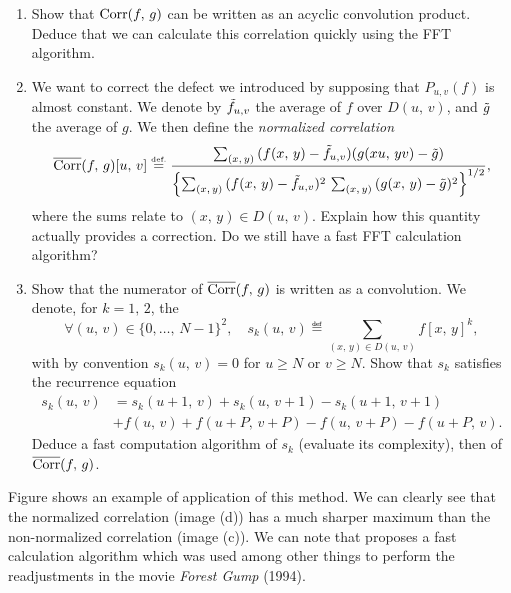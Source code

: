 \begin{exo}
\begin{enumerate}
\item {} Show that $ \operatorname{Corr} (f, \, g) $ can be written as an acyclic convolution product. Deduce that we can calculate this correlation quickly using the FFT algorithm.
\item {} \label{notation-56} We want to correct the defect we introduced by supposing that $ P_{u, v} (f) $ is almost constant. We denote by $ \tilde{f}_{u, v} $ the average of $ f $ over $ D (u, \, v) $, and $ \tilde{g} $ the average of $ g $. We then define the \textit{normalized correlation}
\begin{equation*}
\overline{\operatorname{Corr}} (f, \, g) [u, \, v] \stackrel{\mbox{\upshape\tiny def.}}{=} \frac{\sum_{(x, \, y)}{(f(x, \, y) - \tilde{f}_{u, v}) (g (xu, \, yv) - \tilde{g})}}{\left\{\sum_{(x, \, y)}{(f(x, \, y) - \tilde{f}_{u, v})^2} \, \sum_{(x, \, y)}{(g (x, \, y) - \tilde{g})^2} \right\}^{1/2}},
\end{equation*}
where the sums relate to $ (x, \, y) \in D (u, \, v) $. Explain how this quantity actually provides a correction. Do we still have a fast FFT calculation algorithm?
\item {} Show that the numerator of $ \overline{\operatorname{Corr}} (f, \, g) $ is written as a convolution. We denote, for $ k = 1, \, 2 $, the 
\begin{equation*}
\forall (u, \, v) \in \{0, \ldots, \, N-1 \}^2, \quad s_k (u, \, v) \eqdef \sum_{(x, \, y) \in D (u, \, v)}{f [x, \, y]^k},
\end{equation*}
with by convention $ s_k (u, \, v) = 0 $ for $ u \geq N $ or $ v \geq N $. Show that $ s_k $ satisfies the recurrence equation
\begin{align*}
s_k (u, \, v) & = s_k (u + 1, \, v) + s_k (u, \, v + 1) - s_k (u + 1, \, v + 1) \\
& + f(u, \, v) + f(u + P, \, v + P) - f(u, \, v + P) - f(u + P, \, v).
\end{align*}
 Deduce a fast computation algorithm of $ s_k $ (evaluate its complexity), then of $ \overline{\operatorname{Corr}} (f, \, g) $.
\end{enumerate} Figure  shows an example of application of this method. We can clearly see that the normalized correlation (image (d)) has a much sharper maximum than the non-normalized correlation (image (c)). We can note that{\upshape \cite{lewis}} proposes a fast calculation algorithm which was used among other things to perform the readjustments in the movie \textit{Forest Gump} (1994). \begin{figure}[ht]

\end{figure}
\end{exo}
